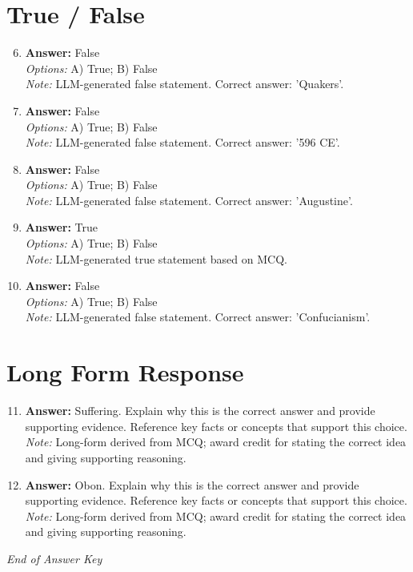 \documentclass[12pt]{article}
\begin{document}
\section*{True / False}
\begin{enumerate}[label=\arabic*.]
\setcounter{enumi}{5}
\item \textbf{Answer:} False
\\ \textit{Options:} A) True; B) False
\\ \textit{Note:} LLM-generated false statement. Correct answer: 'Quakers'.
\item \textbf{Answer:} False
\\ \textit{Options:} A) True; B) False
\\ \textit{Note:} LLM-generated false statement. Correct answer: '596 CE'.
\item \textbf{Answer:} False
\\ \textit{Options:} A) True; B) False
\\ \textit{Note:} LLM-generated false statement. Correct answer: 'Augustine'.
\item \textbf{Answer:} True
\\ \textit{Options:} A) True; B) False
\\ \textit{Note:} LLM-generated true statement based on MCQ.
\item \textbf{Answer:} False
\\ \textit{Options:} A) True; B) False
\\ \textit{Note:} LLM-generated false statement. Correct answer: 'Confucianism'.
\end{enumerate}

\section*{Long Form Response}
\begin{enumerate}[label=\arabic*.]
\setcounter{enumi}{10}
\item \textbf{Answer:} Suffering. Explain why this is the correct answer and provide supporting evidence. Reference key facts or concepts that support this choice.
\\ \textit{Note:} Long-form derived from MCQ; award credit for stating the correct idea and giving supporting reasoning.
\item \textbf{Answer:} Obon. Explain why this is the correct answer and provide supporting evidence. Reference key facts or concepts that support this choice.
\\ \textit{Note:} Long-form derived from MCQ; award credit for stating the correct idea and giving supporting reasoning.
\end{enumerate}

\vfill
\noindent\textit{End of Answer Key}
\end{document}
